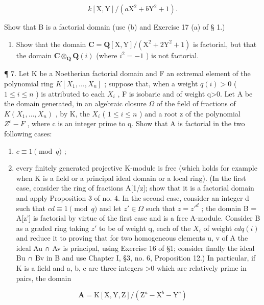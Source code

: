 \[
k [ \mathrm{X}, \mathrm{Y} ] / (a \mathrm{X} ^ {2} + b \mathrm{Y} ^ {2} + 1).
\]

Show that B is a factorial domain (use (b) and Exercise 17 (a) of § 1.)

\begin{enumerate}
\def\labelenumi{(\alph{enumi})}
\setcounter{enumi}{3}
\tightlist
\item
  Show that the domain \(\mathbf{C} = \mathbf{Q}[\mathrm{X},\mathrm{Y}] / (\mathrm{X}^2 +2\mathrm{Y}^2 +1)\) is factorial, but that the domain \(\mathbf{C}\otimes_{\mathbf{Q}}\mathbf{Q}(i)\) (where \(i^2 = -1\) ) is not factorial.
\end{enumerate}

¶ 7. Let K be a Noetherian factorial domain and F an extremal element of the polynomial ring \(K[X_{1},\ldots,X_{n}]\) ; suppose that, when a weight \(q(i)>0\) ( \(1\leqslant i\leqslant n\) ) is attributed to each \(X_{i}\) , F is isobaric and of weight q\textgreater0. Let A be the domain generated, in an algebraic closure \(\Omega\) of the field of fractions of \(K(X_{1},\ldots,X_{n})\) , by K, the \(X_{i}\) ( \(1\leqslant i\leqslant n\) ) and a root z of the polynomial \(Z^{c}-F\) , where c is an integer prime to q. Show that A is factorial in the two following cases:

\begin{enumerate}
\def\labelenumi{(\arabic{enumi})}
\item
  \(c \equiv 1 \pmod{q}\) ;
\item
  every finitely generated projective K-module is free (which holds for example when K is a field or a principal ideal domain or a local ring). (In the first case, consider the ring of fractions A{[}1/z{]}; show that it is a factorial domain and apply Proposition 3 of no. 4. In the second case, consider an integer d such that \(cd \equiv 1 \pmod{q}\) and let \(z' \in \Omega\) such that \(z = z'^{d}\) ; the domain B = A{[}z'{]} is factorial by virtue of the first case and is a free A-module. Consider B as a graded ring taking \(z'\) to be of weight q, each of the \(X_{i}\) of weight \(cdq(i)\) and reduce it to proving that for two homogeneous elements u, v of A the ideal Au ∩ Av is principal, using Exercise 16 of §1; consider finally the ideal Bu ∩ Bv in B and use Chapter I, §3, no. 6, Proposition 12.) In particular, if K is a field and a, b, c are three integers \textgreater0 which are relatively prime in pairs, the domain
\end{enumerate}

\[
\mathbf {A} = \mathrm{K} [ \mathrm{X}, \mathrm{Y}, \mathrm{Z} ] / (\mathrm{Z} ^ {a} - \mathrm{X} ^ {b} - \mathrm{Y} ^ {c})
\]

